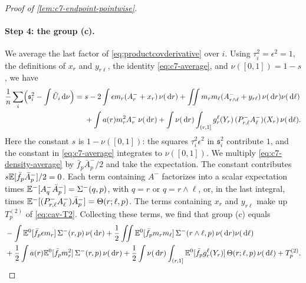 \begin{proof}[Proof of \cref{lem:c7-endpoint-pointwise}]
\paragraph{Step 4: the group (c).}
We average the last factor of \eqref{eq:productcovderivative} over $i$.
Using $\tau_i^2=\epsilon^2=1$, the definitions of $x_r$ and
$y_{r\ell}$, the identity \eqref{eq:c7-average}, and
$\nu([0,1])=1-s$, we have
\begin{align}
 \frac1n\sum_i\Bigl(\mathfrak s_i^2-\int\ddot U_i\,\mathrm d\nu\Bigr)
 ={}&s-2\int\epsilon m_r(A_r^-+x_r)\,\nu(\,\mathrm d r)
 +\iint m_rm_\ell(A_{r\wedge\ell}^-+y_{r\ell})\,\nu(\,\mathrm d r)\nu(\,\mathrm d\ell)
 \nonumber\\
 &+\int a(r)m_r^2A_r^-\,\nu(\,\mathrm d r)
 +\int\nu(\,\mathrm d r)\int_{(r,1]}g_r^\ell(Y_r)\,
 (P^-_{r,\ell}A_\ell^-)(X_r)\,\nu(\,\mathrm d\ell).
 \label{eq:c7-density-average}
\end{align}
Here the constant $s$ is $1-\nu([0,1])$: the squares $\tau_i^2\epsilon^2$
in $\mathfrak s_i^2$ contribute $1$, and the constant in
\eqref{eq:c7-average} integrates to $\nu([0,1])$. We multiply
\eqref{eq:c7-density-average} by $\bar f_p\bar A_p^-/2$ and take the
expectation. The constant contributes $s\mathbb E[\bar f_p\bar A_p^-]/2=0$.
Each term containing $A^-$ factorizes into a scalar expectation times
$\mathbb E^-[A^-_q\bar A_p^-]=\Sigma^-(q,p)$, with $q=r$ or $q=r\wedge\ell$,
or, in the last integral, times
$\mathbb E^-[(P^-_{r,\ell}A_\ell^-)\bar A_p^-]=\Theta(r;\ell,p)$. The terms containing $x_r$ and $y_{r\ell}$ make
up $T_p^{(2)}$ of \eqref{eq:cav-T2}. Collecting these terms, we find
that group (c) equals
\begin{equation}\label{eq:c7-group-c}
 \begin{aligned}
 &-\int\mathbb E^0[\bar f_p\epsilon m_r]\,\Sigma^-(r,p)\,\nu(\,\mathrm d r)
 +\frac12\iint\mathbb E^0[\bar f_pm_rm_\ell]\,
      \Sigma^-(r\wedge\ell,p)\,\nu(\,\mathrm d r)\nu(\,\mathrm d\ell)\\
 &+\frac12\int a(r)\mathbb E^0[\bar f_pm_r^2]\,\Sigma^-(r,p)\,\nu(\,\mathrm d r)
 +\frac12\int\nu(\,\mathrm d r)\int_{(r,1]}
       \mathbb E^0[\bar f_pg_r^\ell(Y_r)]\,\Theta(r;\ell,p)\,\nu(\,\mathrm d\ell)
 +T_p^{(2)}.
 \end{aligned}
\end{equation}


\end{proof}
